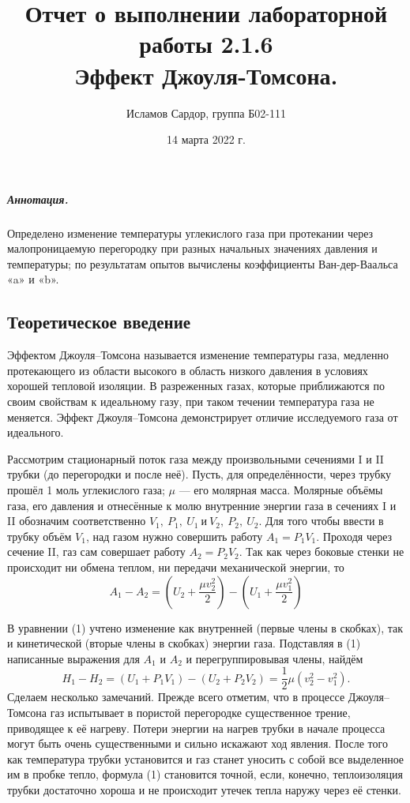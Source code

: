 \documentclass[12pt,a4paper]{article}
\title{
Отчет о выполнении лабораторной работы 2.1.6 \\
Эффект Джоуля-Томсона.}
\author{Исламов Сардор, группа Б02-111}
\date{14 марта 2022 г.}
\begin{document}
\maketitle

\subparagraph*{Аннотация.} Определено изменение температуры углекислого газа при протекании через малопроницаемую перегородку при разных начальных значениях давления и температуры;
 по результатам опытов вычислены коэффициенты Ван-дер-Ваальса «a» и «b».

\subsection*{Теоретическое введение}

Эффектом Джоуля–Томсона называется изменение температуры газа, медленно протекающего из области высокого в область низкого давления в условиях хорошей тепловой изоляции. 
В разреженных газах, которые приближаются по своим свойствам к идеальному газу, при таком течении температура газа не меняется. 
Эффект Джоуля–Томсона демонстрирует отличие исследуемого газа от идеального.

Рассмотрим стационарный поток газа между произвольными сечениями I и II трубки (до перегородки и после неё).
Пусть, для определённости, через трубку прошёл 1 моль углекислого газа; $\mu$ — его молярная масса. 
Молярные объёмы газа, его давления и отнесённые к молю внутренние энергии газа в сечениях I и II обозначим соответственно $V_1,\ P_1,\ U_1\ и\ V_2,\ P_2,\ U_2$. 
Для того чтобы ввести в трубку объём $V_1$, над газом нужно совершить работу $A_1 = P_1V_1$. 
Проходя через сечение II, газ сам совершает работу $A_2 = P_2V_2$. 
Так как через боковые стенки не происходит ни обмена теплом, ни передачи механической энергии, то
\begin{equation}
    A_1 - A_2 = \left( U_2 + \frac{\mu v_2 ^2}{2}\right) - \left(U_1 + \frac{\mu v_1^2}{2}\right)
\end{equation}

В уравнении (1) учтено изменение как внутренней (первые члены в скобках), так и кинетической (вторые члены в скобках) энергии газа. 
Подставляя в (1) написанные выражения для $A_1$ и $A_2$ и перегруппировывая члены, найдём
\begin{equation}
    H_1 - H_2 = (U_1 + P_1 V_1) - (U_2 + P_2 V_2) = \frac 1 2\mu (v_2^2 - v_1^2).
\end{equation}
Сделаем несколько замечаний. 
Прежде всего отметим, что в процессе Джоуля–Томсона газ испытывает в пористой перегородке существенное трение, приводящее к её нагреву. 
Потери энергии на нагрев трубки в начале процесса могут быть очень существенными и сильно искажают ход явления. 
После того как температура трубки установится и газ станет уносить с собой все выделенное им в пробке тепло, формула (1) становится точной, если, конечно, теплоизоляция трубки достаточно хороша и не происходит утечек тепла наружу через её стенки.
\end{document}
